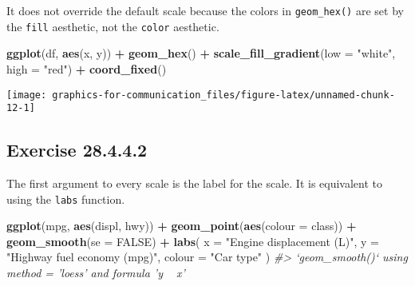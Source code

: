 \documentclass[]{book}
\newenvironment{Shaded}{\begin{snugshade}}{\end{snugshade}}
\newcommand{\CommentTok}[1]{\textcolor[rgb]{0.56,0.35,0.01}{\textit{#1}}}
\newcommand{\DataTypeTok}[1]{\textcolor[rgb]{0.13,0.29,0.53}{#1}}
\newcommand{\KeywordTok}[1]{\textcolor[rgb]{0.13,0.29,0.53}{\textbf{#1}}}
\newcommand{\NormalTok}[1]{#1}
\newcommand{\OperatorTok}[1]{\textcolor[rgb]{0.81,0.36,0.00}{\textbf{#1}}}
\newcommand{\OtherTok}[1]{\textcolor[rgb]{0.56,0.35,0.01}{#1}}
\newcommand{\StringTok}[1]{\textcolor[rgb]{0.31,0.60,0.02}{#1}}
\theoremstyle{plain}
\theoremstyle{remark}
\begin{document}
It does not override the default scale because the colors in
\texttt{geom\_hex()} are set by the \texttt{fill} aesthetic, not the
\texttt{color} aesthetic.

\begin{Shaded}
\begin{Highlighting}[]
\KeywordTok{ggplot}\NormalTok{(df, }\KeywordTok{aes}\NormalTok{(x, y)) }\OperatorTok{+}
\StringTok{  }\KeywordTok{geom_hex}\NormalTok{() }\OperatorTok{+}
\StringTok{  }\KeywordTok{scale_fill_gradient}\NormalTok{(}\DataTypeTok{low =} \StringTok{"white"}\NormalTok{, }\DataTypeTok{high =} \StringTok{"red"}\NormalTok{) }\OperatorTok{+}
\StringTok{  }\KeywordTok{coord_fixed}\NormalTok{()}
\end{Highlighting}
\end{Shaded}

\begin{center}\texttt{[image: graphics-for-communication\_files/figure-latex/unnamed-chunk-12-1]} \end{center}

\hypertarget{exercise-28.4.4.2}{%
\subsection*{\texorpdfstring{Exercise
{28.4.4.2}}{Exercise 28.4.4.2}}\label{exercise-28.4.4.2}}

The first argument to every scale is the label for the scale. It is
equivalent to using the \texttt{labs} function.

\begin{Shaded}
\begin{Highlighting}[]
\KeywordTok{ggplot}\NormalTok{(mpg, }\KeywordTok{aes}\NormalTok{(displ, hwy)) }\OperatorTok{+}
\StringTok{  }\KeywordTok{geom_point}\NormalTok{(}\KeywordTok{aes}\NormalTok{(}\DataTypeTok{colour =}\NormalTok{ class)) }\OperatorTok{+}
\StringTok{  }\KeywordTok{geom_smooth}\NormalTok{(}\DataTypeTok{se =} \OtherTok{FALSE}\NormalTok{) }\OperatorTok{+}
\StringTok{  }\KeywordTok{labs}\NormalTok{(}
    \DataTypeTok{x =} \StringTok{"Engine displacement (L)"}\NormalTok{,}
    \DataTypeTok{y =} \StringTok{"Highway fuel economy (mpg)"}\NormalTok{,}
    \DataTypeTok{colour =} \StringTok{"Car type"}
\NormalTok{  )}
\CommentTok{#> `geom_smooth()` using method = 'loess' and formula 'y ~ x'}
\end{Highlighting}
\end{Shaded}
\end{document}

